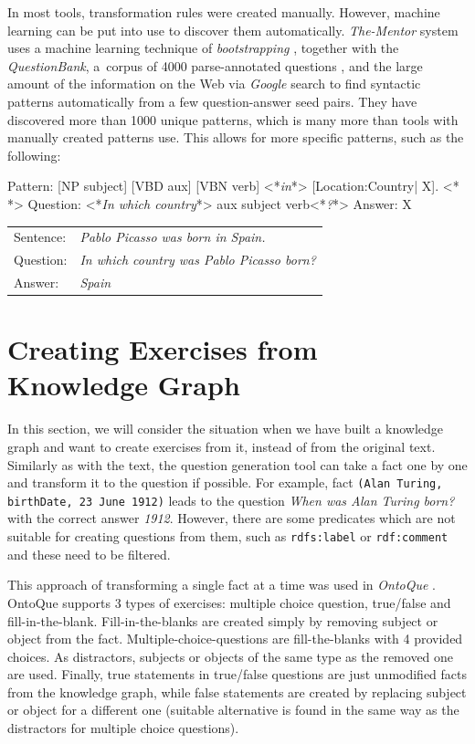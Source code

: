 \documentclass[12pt, twoside]{fithesis2}
\makeatletter
\renewcommand{\_}{\leavevmode \kern0.07em\vbox{\hrule width0.4em}}
\newcommand{\arrowlinesplit}{%
  \noindent\makebox[\linewidth]{\raisebox{0.15em}{\rule{0.478\textwidth}{0.5pt}}%
  ~$\downarrow$~%
  \noindent\raisebox{0.15em}{\rule{0.478\textwidth}{0.5pt}}}%
}
\newcounter{choice}
\newcommand{\transformationExample}[3]{%
\vspace{-0.5em}
\noindent %
\begin{tabularx}{\linewidth}{@{} l X @{}}
Sentence: & \emph{#1}\\
Question: & \emph{#2}\\
Answer:   & \emph{#3}\\
  \hline
\end{tabularx}
}
\makeatother
\begin{document}
In most tools, transformation rules were created manually.
However, machine learning can be put into use to discover them automatically.
\textit{The-Mentor} system \cite{mentor}
uses a machine learning technique of \textit{bootstrapping} \cite{question-answering-bootstrapping},
together with the \textit{QuestionBank}, a~corpus of 4000 parse-annotated questions \cite{question-bank},
and the large amount of the information on the Web via \textit{Google} search
to find syntactic patterns automatically from a few question-answer seed pairs.
They have discovered more than 1000 unique patterns, which is many more than tools with manually created patterns use. This allows for more specific patterns, such as the following:
\begin{code}
Pattern: [NP subject] [VBD aux] [VBN verb] <*\emph{in}*> [Location:Country| X].
<*\arrowlinesplit*>
Question: <*\emph{In which country}*> aux subject verb<*\emph{?}*>
Answer: X
\end{code}
\transformationExample%
{Pablo Picasso was born in Spain.}%
{In which country was Pablo Picasso born?}%
{Spain}


\section{Creating Exercises from Knowledge Graph}
\label{sec:exercises-from-knowledge-graph}

In this section, we will consider the situation when we have built a knowledge graph
and want to create exercises from it, instead of from the original text.
Similarly as with the text, the question generation tool can take a fact one by one
and transform it to the question if possible.
For example, fact \texttt{(Alan Turing, birthDate, 23 June 1912)} leads to the question
\textit{When was Alan Turing born?} with the correct answer \textit{1912}.
However, there are some predicates which are not suitable for creating questions from them,
such as \texttt{rdfs:label} or \texttt{rdf:comment} and these need to be filtered.

This approach of transforming a single fact at a time was used in \textit{OntoQue} \cite{ontoque}.
OntoQue supports 3 types of exercises: multiple choice question, true/false and fill-in-the-blank.
Fill-in-the-blanks are created simply by removing subject or object from the fact.
Multiple-choice-questions are fill-the-blanks with 4 provided choices.
As distractors, subjects or objects of the same type as the removed one are used.
Finally, true statements in true/false questions are just unmodified facts from the knowledge graph,
while false statements are created by replacing subject or object for a different one (suitable alternative is found in the same way as the distractors for multiple choice questions).
\end{document}
